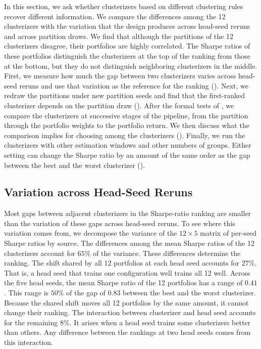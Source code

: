 In this section, we ask whether clusterizers based on different clustering rules recover different information. We compare the differences among the 12 clusterizers with the variation that the design produces across head-seed reruns and across partition draws. We find that although the partitions of the 12 clusterizers disagree, their portfolios are highly correlated. The Sharpe ratios of these portfolios distinguish the clusterizers at the top of the ranking from those at the bottom, but they do not distinguish neighboring clusterizers in the middle. First, we measure how much the gap between two clusterizers varies across head-seed reruns and use that variation as the reference for the ranking (). Next, we redraw the partitions under new partition seeds and find that the first-ranked clusterizer depends on the partition draw (). After the formal tests of , we compare the clusterizers at successive stages of the pipeline, from the partition through the portfolio weights to the portfolio return. We then discuss what the comparison implies for choosing among the clusterizers (). Finally, we run the clusterizers with other estimation windows and other numbers of groups. Either setting can change the Sharpe ratio by an amount of the same order as the gap between the best and the worst clusterizer ().

\subsection{Variation across Head-Seed Reruns}
\label{sec:field}

Most gaps between adjacent clusterizers in the Sharpe-ratio ranking are smaller than the variation of these gaps across head-seed reruns. To see where this variation comes from, we decompose the variance of the $12 \times 5$ matrix of per-seed Sharpe ratios by source. The differences among the mean Sharpe ratios of the 12 clusterizers account for $65\%$ of the variance. These differences determine the ranking. The shift shared by all 12 portfolios at each head seed accounts for $27\%$. That is, a head seed that trains one configuration well trains all 12 well. Across the five head seeds, the mean Sharpe ratio of the 12 portfolios has a range of $0.41$. This range is $50\%$ of the gap of $0.83$ between the best and the worst clusterizer. Because the shared shift moves all 12 portfolios by the same amount, it cannot change their ranking. The interaction between clusterizer and head seed accounts for the remaining $8\%$. It arises when a head seed trains some clusterizers better than others. Any difference between the rankings at two head seeds comes from this interaction.

